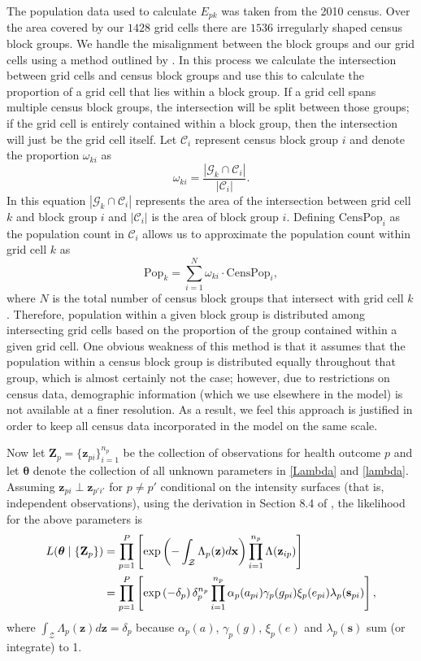 \documentclass[final]{statsoc}
\begin{document}
The population data used to calculate $E_{pk}$ was taken from the 2010 census. 
Over the area covered
by our $1428$ grid cells there are $1536$ irregularly shaped census block groups. We handle
the misalignment between the block groups and our grid cells using a method outlined
by \cite{Brunsdon2015}. In this process we calculate the intersection
between grid cells and census block groups and use this to calculate the proportion of
a grid cell that lies within a block group. If a grid cell spans multiple
census block groups, the intersection will be split between those groups; if the grid cell 
is entirely contained within a block group, then the intersection will just be the grid cell 
itself. Let $\mathcal{C}_i$ represent census block group $i$ and denote the proportion
$\omega_{ki}$ as
$$\omega_{ki} = \frac{\left| \mathcal{G}_k \cap \mathcal{C}_i \right|}
  {\left|\mathcal{C}_i\right|}.$$ 
In this equation $\left| \mathcal{G}_k \cap \mathcal{C}_i \right|$ represents
the area of the intersection between grid cell $k$ and block group $i$ and 
$\left| \mathcal{C}_i \right|$ is the area of block group $i$. 
Defining $\text{CensPop}_i$ as the population count in $\mathcal{C}_i$ allows us to approximate the population count
within grid cell $k$ as $$\text{Pop}_k = \sum_{i=1}^{N} \omega_{ki}\cdot \text{CensPop}_i,$$
where $N$ is the total
number of census block groups that intersect with grid cell $k$. Therefore, population within
a given block group is distributed among intersecting grid cells based on the proportion
of the group contained within a given grid cell. One obvious weakness of this 
method is that it assumes that the population within
a census block group is distributed equally throughout that group, which is almost
certainly not the case; however, due to restrictions on census data, demographic information (which we use elsewhere in the model) is not available at a finer resolution. As a result, we feel this approach is justified in order to keep all census data incorporated in the model on the same scale.


Now let $\mathbf{Z}_p = \{\mathbf{z}_{pi}\}_{i=1}^{n_p}$ be the collection of observations for
health outcome $p$ and let $\boldsymbol{\theta}$ denote the collection of all unknown parameters 
in \eqref{Lambda} and \eqref{lambda}.  Assuming $\mathbf{z}_{pi} \perp \mathbf{z}_{p'i'}$ for
 $p \neq p'$ conditional on the intensity surfaces (that is, independent observations),  
using the derivation in Section 8.4 of \cite{Banerjee2014}, the likelihood for the 
above parameters is
\begin{align}
L(\boldsymbol{\theta} \mid \{\mathbf{Z}_p\}) &=  \prod_{p=1}^P\left[\exp\left(-\int_\mathcal{Z}\Lambda_p
(\mathbf{z})d\mathbf{x}\right)\prod_{i=1}^{n_p}\Lambda(\mathbf{z}_{ip})\right] \notag \\
&= \prod_{p=1}^P\left[\exp\left(-\delta_p\right)\delta_p^{n_p}\prod_{i=1}^{n_p}
\alpha_p(a_{pi})\gamma_p(g_{pi})\xi_p(e_{pi})\lambda_p(\mathbf{s}_{pi})\right],
\label{likelihood}
\end{align}
where $\int_{\mathcal{Z}}\Lambda_p(\mathbf{z})d\mathbf{z} = \delta_p$ because $\alpha_p(a)$, 
$\gamma_p(g)$, $\xi_p(e)$ and $\lambda_p(\mathbf{s})$ sum (or integrate) to 1.
\end{document}
